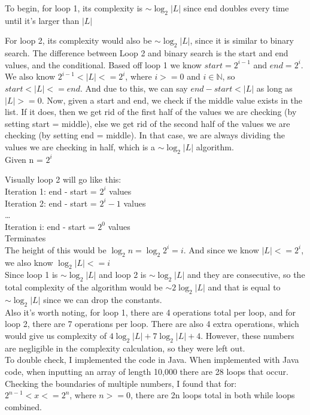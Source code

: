 \documentclass{article}
\begin{document}
To begin, for loop 1, its complexity is $\sim\log_2 |L|$ since end doubles every time until it's larger than $|L|$

For loop 2, its complexity would also be $\sim\log_2 |L|$, since it is similar to binary search. The difference between Loop 2 and binary search is the start and end values, and the conditional.
Based off loop 1 we know $start = 2^{i-1}$ and $end = 2^{i}$.
We also know $2^{i-1} < |L| <= 2^{i}$, where $i >= 0$ and $i \in \mathbb{N}$, so $start < |L| <= end$. And due to this, we can say $end - start < |L|$ as long as $|L| >= 0$.
Now, given a start and end, we check if the middle value exists in the list. If it does, then we get rid of the first half of the values we are checking (by setting start = middle), else we get rid of the second half of the values we are checking (by setting end = middle).
In that case, we are always dividing the values we are checking in half, which is a $\sim\log_2 |L|$ algorithm.\\

Given n = $2^i$

Visually loop 2 will go like this:\\
Iteration 1: end - start = $2^i$ values\\
Iteration 2: end - start = $2^i-1$ values\\
\dots\\
Iteration i: end - start = $2^0$ values\\
\indent Terminates\\

The height of this would be $\log_2 n = \log_2 2^i = i$. And since we know $|L| <= 2^{i}$, we also know $\log_2|L| <= i$\\

Since loop 1 is $\sim\log_2 |L|$ and loop 2 is $\sim\log_2 |L|$ and they are consecutive, so the total complexity of the algorithm would be $\sim 2\log_2 |L|$ and that is equal to $\sim\log_2 |L|$ since we can drop the constants.\\
\indent Also it's worth noting, for loop 1, there are 4 operations total per loop, and for loop 2, there are 7 operations per loop. There are also 4 extra operations, which would give us complexity of $4\log_2 |L| + 7\log_2 |L| + 4$. However, these numbers are negligible in the complexity calculation, so they were left out.\\
\indent To double check, I implemented the code in Java. When implemented with Java code, when inputting an array of length 10,000 there are 28 loops that occur.
Checking the boundaries of multiple numbers, I found that for:\\
$2^{n-1} < x <= 2^{n}$, where $n >= 0$, there are 2n loops total in both while loops combined.\\
\end{document}
